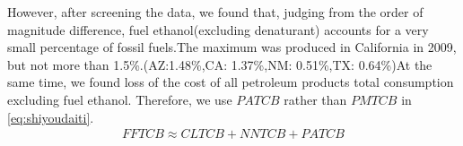 \documentclass{mcmthesis}
\begin{document}
However, after screening the data, we found that, judging from the order of magnitude difference, fuel ethanol(excluding denaturant) accounts for a very small percentage of fossil fuels.The maximum was produced in California in 2009, but not more than 1.5\%.(AZ:1.48\%,CA: 1.37\%,NM: 0.51\%,TX: 0.64\%)At the same time, we found loss of the cost of all petroleum products total consumption excluding fuel ethanol.
Therefore, we use $ PATCB $ rather than $ PMTCB $ in \autoref{eq:shiyoudaiti}.
\begin{align}
FFTCB \approx CLTCB + NNTCB + PATCB\label{eq:shiyoudaiti}
\end{align}
%
%
%
%
%
%
%
%
%
%
%
%
%
\end{document}
